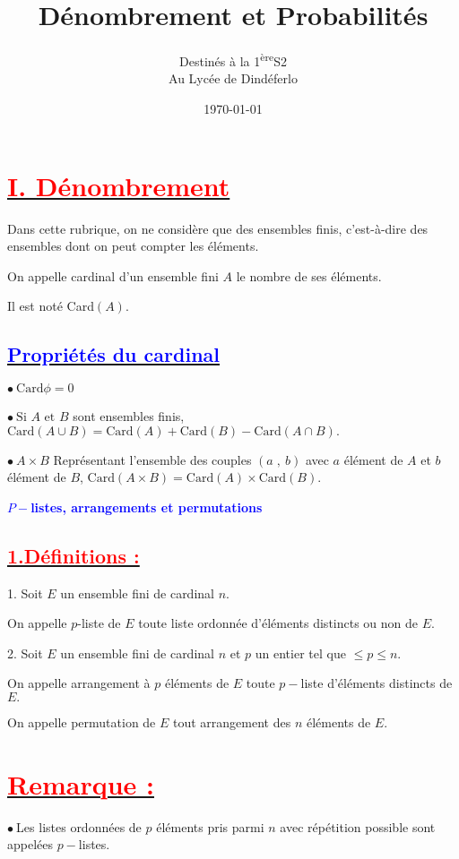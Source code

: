 \documentclass[12pt]{article}
\author{Destinés à la 1\textsuperscript{ère}S2\\Au Lycée de Dindéferlo}
\title{\textbf{Dénombrement et Probabilités}}
\date{\today}
\begin{document}
\maketitle
\newpage

\section*{\underline{\textbf{\textcolor{red}{I. Dénombrement}}}}
Dans cette rubrique, on ne considère que des ensembles finis, c'est-à-dire des ensembles dont on peut compter les éléments.
 
On appelle cardinal d'un ensemble fini $A$ le nombre de ses éléments.

Il est noté Card$(A).$
\subsection*{\underline{\textbf{\textcolor{blue}{Propriétés du cardinal}}}}
$\bullet\ \text{Card}\phi=0$

$\bullet\ \text{Si }A\text{ et }B$ sont ensembles finis, $\text{Card}(A\cup B)=\text{Card}(A)+\text{Card}(B)-\text{Card}(A\cap B).$

	$\bullet\ A\times B$ Représentant l'ensemble des couples $(a\;,\ b)$ avec $a$ élément de $A$ et $b$ élément de $B$, $\text{Card}(A\times B)=\text{Card}(A)\times\text{Card}(B).$
	
\textbf{\textcolor{blue}{$P-$listes, arrangements et permutations}}
\subsection*{\underline{\textbf{\textcolor{red}{1.Définitions :}}}}
1. Soit $E$ un ensemble fini de cardinal $n.$

On appelle $p$-liste de $E$ toute liste ordonnée d'éléments distincts ou non de $E.$

2. Soit $E$ un ensemble fini de cardinal $n$ et $p$ un entier tel que $\leq p\leq n.$

On appelle arrangement à $p$ éléments de $E$ toute $p-$liste d'éléments distincts  de $E.$

On appelle permutation de $E$ tout arrangement des $n$ éléments de $E.$
\section*{\underline{\textbf{\textcolor{red}{Remarque :}}}}
$\bullet\ $Les listes ordonnées de $p$ éléments pris parmi $n$ avec répétition possible sont appelées $p-$listes.
\end{document}
